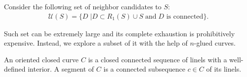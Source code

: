 \documentclass[smallextended]{svjour3}       %
\begin{document}
Consider the following set of neighbor candidates to $S$:
\begin{align*}
\mathcal{U}(S) = \{ D \; | D \subset R_1(S) \cup S \; \text{and} \; \text{$D$ is connected} \}.
\end{align*}


Such set can be extremely large and its complete exhaustion is prohibitively expensive.  Instead, we explore a subset of it with the help of $n$-glued curves.

An oriented closed curve $C$ is a closed connected sequence of linels with a well-defined interior. A segment of $C$ is a connected subsequence $c \in C$ of its linels.

\begin{figure}[!h]
\center
	\hspace{40pt}%
	\subfloat[\label{}]{%
}
\end{figure}
\end{document}
